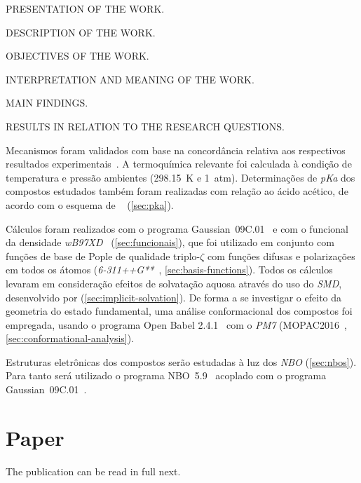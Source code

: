 PRESENTATION OF THE WORK.\@

DESCRIPTION OF THE WORK.\@

OBJECTIVES OF THE WORK.\@

INTERPRETATION AND MEANING OF THE WORK.\@

MAIN FINDINGS.\@

RESULTS IN RELATION TO THE RESEARCH QUESTIONS.\@



Mecanismos foram validados com base na concordância relativa aos respectivos resultados experimentais~\cite{Kirby_1972,Jung_2005}.
A termoquímica relevante foi calculada à condição de temperatura e pressão ambientes (298.15~K e 1~atm).
Determinações de \emph{pKa} dos compostos estudados também foram realizadas com
relação ao ácido acético, de acordo com o esquema de
\citeauthor{Ding_2009}~\cite{Ding_2009} (\autoref{sec:pka}).

Cálculos foram realizados com o programa Gaussian~09C.01~\cite{g09} e com o funcional da densidade
\emph{wB97XD}~\cite{Chai_2008a,Chai_2008b} (\autoref{sec:funcionais}), que foi
utilizado em conjunto com funções de base de Pople de qualidade triplo-$\zeta$
com funções difusas e polarizações em todos os átomos
(\emph{6-311++G**}~\cite{Ditchfield_1971,Hehre_1972,Hariharan_1973,Hariharan_1974,Gordon_1980,Francl_1982,Clark_1983,Frisch_1984,Binning_1990,Blaudeau_1997,Rassolov_1998,Rassolov_2001},
\autoref{sec:basis-functions}).
Todos os cálculos levaram em consideração efeitos de solvatação aquosa através
do uso do \emph{SMD}, desenvolvido por \citeauthor{Marenich_2009} (\autoref{sec:implicit-solvation}).
De forma a se investigar o efeito da geometria do estado fundamental, uma
análise conformacional dos compostos foi empregada, usando o programa Open
Babel 2.4.1~\cite{O_Boyle_2011} com o \emph{PM7} (MOPAC2016~\cite{MOPAC},
\autoref{sec:conformational-analysis}).

Estruturas eletrônicas dos compostos serão estudadas à luz dos \emph{NBO}
(\autoref{sec:nbos}).
Para tanto será utilizado o programa NBO~5.9~\cite{NBO5.9} acoplado com o programa Gaussian~09C.01~\cite{g09}.

\section{Paper}

The publication can be read in full next.


